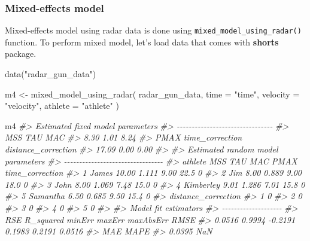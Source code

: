 \documentclass[fleqn,10pt,lineno]{wlpeerj} %
\newenvironment{Shaded}{\begin{snugshade}}{\end{snugshade}}
\newcommand{\AttributeTok}[1]{\textcolor[rgb]{0.77,0.63,0.00}{#1}}
\newcommand{\CommentTok}[1]{\textcolor[rgb]{0.56,0.35,0.01}{\textit{#1}}}
\newcommand{\FunctionTok}[1]{\textcolor[rgb]{0.00,0.00,0.00}{#1}}
\newcommand{\NormalTok}[1]{#1}
\newcommand{\OtherTok}[1]{\textcolor[rgb]{0.56,0.35,0.01}{#1}}
\newcommand{\StringTok}[1]{\textcolor[rgb]{0.31,0.60,0.02}{#1}}
\begin{document}
\hypertarget{mixed-effects-model-1}{%
\subsubsection{Mixed-effects model}\label{mixed-effects-model-1}}

Mixed-effects model using radar data is done using \texttt{mixed\_model\_using\_radar()} function. To perform mixed model, let's load data that comes with \textbf{shorts} package.

\begin{Shaded}
\begin{Highlighting}[]
\FunctionTok{data}\NormalTok{(}\StringTok{"radar\_gun\_data"}\NormalTok{)}

\NormalTok{m4 }\OtherTok{\textless{}{-}} \FunctionTok{mixed\_model\_using\_radar}\NormalTok{(}
\NormalTok{  radar\_gun\_data,}
  \AttributeTok{time =} \StringTok{"time"}\NormalTok{,}
  \AttributeTok{velocity =} \StringTok{"velocity"}\NormalTok{,}
  \AttributeTok{athlete =} \StringTok{"athlete"}
\NormalTok{)}

\NormalTok{m4}
\CommentTok{\#\textgreater{} Estimated fixed model parameters}
\CommentTok{\#\textgreater{} {-}{-}{-}{-}{-}{-}{-}{-}{-}{-}{-}{-}{-}{-}{-}{-}{-}{-}{-}{-}{-}{-}{-}{-}{-}{-}{-}{-}{-}{-}{-}{-}}
\CommentTok{\#\textgreater{}                 MSS                 TAU                 MAC }
\CommentTok{\#\textgreater{}                8.30                1.01                8.24 }
\CommentTok{\#\textgreater{}                PMAX     time\_correction distance\_correction }
\CommentTok{\#\textgreater{}               17.09                0.00                0.00 }
\CommentTok{\#\textgreater{} }
\CommentTok{\#\textgreater{} Estimated random model parameters}
\CommentTok{\#\textgreater{} {-}{-}{-}{-}{-}{-}{-}{-}{-}{-}{-}{-}{-}{-}{-}{-}{-}{-}{-}{-}{-}{-}{-}{-}{-}{-}{-}{-}{-}{-}{-}{-}{-}}
\CommentTok{\#\textgreater{}     athlete   MSS   TAU  MAC PMAX time\_correction}
\CommentTok{\#\textgreater{} 1     James 10.00 1.111 9.00 22.5               0}
\CommentTok{\#\textgreater{} 2       Jim  8.00 0.889 9.00 18.0               0}
\CommentTok{\#\textgreater{} 3      John  8.00 1.069 7.48 15.0               0}
\CommentTok{\#\textgreater{} 4 Kimberley  9.01 1.286 7.01 15.8               0}
\CommentTok{\#\textgreater{} 5  Samantha  6.50 0.685 9.50 15.4               0}
\CommentTok{\#\textgreater{}   distance\_correction}
\CommentTok{\#\textgreater{} 1                   0}
\CommentTok{\#\textgreater{} 2                   0}
\CommentTok{\#\textgreater{} 3                   0}
\CommentTok{\#\textgreater{} 4                   0}
\CommentTok{\#\textgreater{} 5                   0}
\CommentTok{\#\textgreater{} }
\CommentTok{\#\textgreater{} Model fit estimators}
\CommentTok{\#\textgreater{} {-}{-}{-}{-}{-}{-}{-}{-}{-}{-}{-}{-}{-}{-}{-}{-}{-}{-}{-}{-}}
\CommentTok{\#\textgreater{}       RSE R\_squared    minErr    maxErr maxAbsErr      RMSE }
\CommentTok{\#\textgreater{}    0.0516    0.9994   {-}0.2191    0.1983    0.2191    0.0516 }
\CommentTok{\#\textgreater{}       MAE      MAPE }
\CommentTok{\#\textgreater{}    0.0395       NaN}
\end{Highlighting}
\end{Shaded}
\end{document}

